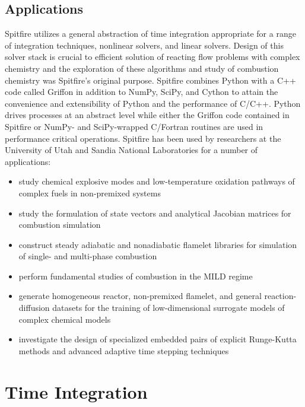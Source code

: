 \documentclass[letterpaper,10pt,english]{sphinxmanual}
\begin{document}
\section{Applications}
\label{\detokenize{introduction:applications}}
Spitfire utilizes a general abstraction of time integration appropriate for a range of integration techniques, nonlinear solvers, and linear solvers.
Design of this solver stack is crucial to efficient solution of reacting flow problems with complex chemistry
and the exploration of these algorithms and study of combustion chemistry was Spitfire’s original purpose.
Spitfire combines Python with a C++ code called Griffon in addition to NumPy, SciPy, and Cython to attain the convenience and extensibility of Python and the performance of C/C++.
Python drives processes at an abstract level while either the Griffon code contained in Spitfire or NumPy- and SciPy-wrapped C/Fortran routines are used in performance critical operations.
Spitfire has been used by researchers at the University of Utah and Sandia National Laboratories for a number of applications:
\begin{itemize}
\item {} 
study chemical explosive modes and low-temperature oxidation pathways of complex fuels in non-premixed systems

\item {} 
study the formulation of state vectors and analytical Jacobian matrices for combustion simulation

\item {} 
construct steady adiabatic and nonadiabatic flamelet libraries for simulation of single- and multi-phase combustion

\item {} 
perform fundamental studies of combustion in the MILD regime

\item {} 
generate homogeneous reactor, non-premixed flamelet, and general reaction-diffusion datasets for the training of low-dimensional surrogate models of complex chemical models

\item {} 
investigate the design of specialized embedded pairs of explicit Runge-Kutta methods and advanced adaptive time stepping techniques

\end{itemize}


\chapter{Time Integration}
\label{\detokenize{timeintegration:time-integration}}\label{\detokenize{timeintegration::doc}}
\end{document}
